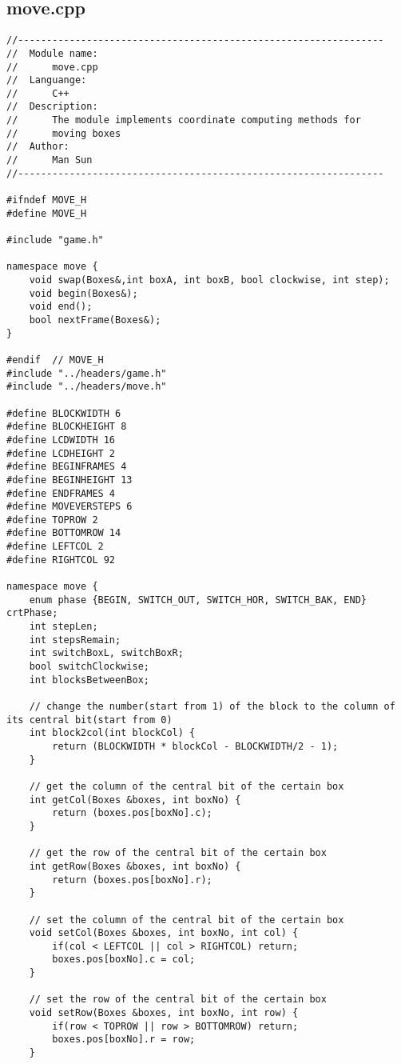 \subsection{move.cpp}
\begin{verbatim}
//----------------------------------------------------------------
//  Module name:
//      move.cpp
//  Languange:
//      C++
//  Description:
//      The module implements coordinate computing methods for 
//      moving boxes
//  Author:
//      Man Sun
//----------------------------------------------------------------

#ifndef MOVE_H
#define MOVE_H

#include "game.h"

namespace move {
    void swap(Boxes&,int boxA, int boxB, bool clockwise, int step);
    void begin(Boxes&);
    void end();
    bool nextFrame(Boxes&);
}

#endif  // MOVE_H
#include "../headers/game.h"
#include "../headers/move.h"

#define BLOCKWIDTH 6
#define BLOCKHEIGHT 8
#define LCDWIDTH 16
#define LCDHEIGHT 2
#define BEGINFRAMES 4
#define BEGINHEIGHT 13
#define ENDFRAMES 4
#define MOVEVERSTEPS 6
#define TOPROW 2
#define BOTTOMROW 14
#define LEFTCOL 2
#define RIGHTCOL 92

namespace move {
    enum phase {BEGIN, SWITCH_OUT, SWITCH_HOR, SWITCH_BAK, END} crtPhase;
    int stepLen;
    int stepsRemain;
    int switchBoxL, switchBoxR;
    bool switchClockwise;
    int blocksBetweenBox;

    // change the number(start from 1) of the block to the column of its central bit(start from 0)
    int block2col(int blockCol) {
        return (BLOCKWIDTH * blockCol - BLOCKWIDTH/2 - 1);
    }

    // get the column of the central bit of the certain box
    int getCol(Boxes &boxes, int boxNo) {
        return (boxes.pos[boxNo].c);
    }

    // get the row of the central bit of the certain box
    int getRow(Boxes &boxes, int boxNo) {
        return (boxes.pos[boxNo].r);
    }

    // set the column of the central bit of the certain box
    void setCol(Boxes &boxes, int boxNo, int col) {
        if(col < LEFTCOL || col > RIGHTCOL) return;
        boxes.pos[boxNo].c = col;
    }

    // set the row of the central bit of the certain box
    void setRow(Boxes &boxes, int boxNo, int row) {
        if(row < TOPROW || row > BOTTOMROW) return;
        boxes.pos[boxNo].r = row;
    }


\end{verbatim}
